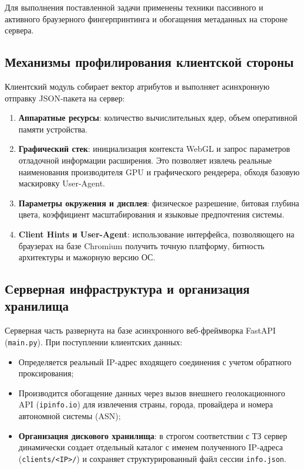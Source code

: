 \documentclass[a4paper]{article}
\begin{document}
Для выполнения поставленной задачи применены техники пассивного и активного браузерного фингерпринтинга и обогащения метаданных на стороне сервера.

\subsection{Механизмы профилирования клиентской стороны}
Клиентский модуль собирает вектор атрибутов и выполняет асинхронную отправку JSON-пакета на сервер:
\begin{enumerate}
    \item \textbf{Аппаратные ресурсы}: количество вычислительных ядер, объем оперативной памяти устройства.
    \item \textbf{Графический стек}: инициализация контекста WebGL и запрос параметров отладочной информации расширения. Это позволяет извлечь реальные наименования производителя GPU и графического рендерера, обходя базовую маскировку User-Agent.
    \item \textbf{Параметры окружения и дисплея}: физическое разрешение, битовая глубина цвета, коэффициент масштабирования и языковые предпочтения системы.
    \item \textbf{Client Hints и User-Agent}: использование интерфейса, позволяющего на браузерах на базе Chromium получить точную платформу, битность архитектуры и мажорную версию ОС.
\end{enumerate}

\subsection{Серверная инфраструктура и организация хранилища}
Серверная часть развернута на базе асинхронного веб-фреймворка FastAPI (\texttt{main.py}). При поступлении клиентских данных:
\begin{itemize}
    \item Определяется реальный IP-адрес входящего соединения с учетом обратного проксирования;
    \item Производится обогащение данных через вызов внешнего геолокационного API (\texttt{ipinfo.io}) для извлечения страны, города, провайдера и номера автономной системы (ASN);
    \item \textbf{Организация дискового хранилища}: в строгом соответствии с ТЗ сервер динамически создает отдельный каталог с именем полученного IP-адреса (\texttt{clients/<IP>/}) и сохраняет структурированный файл сессии \texttt{info.json}.
\end{itemize}
\end{document}
